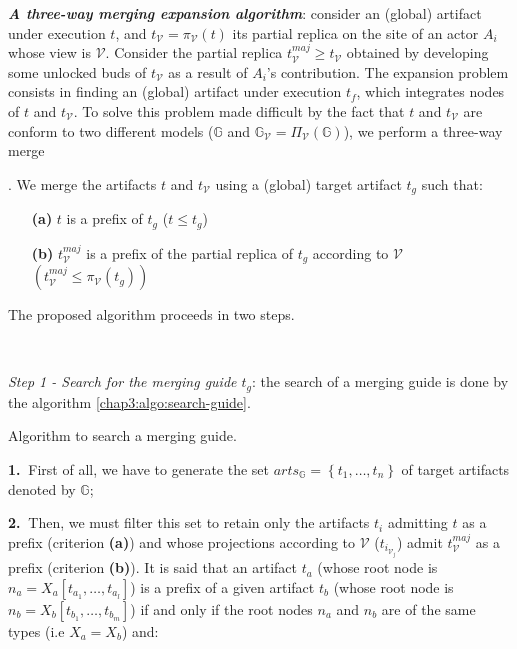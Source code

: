 \noindent\textbf{\textit{A three-way merging expansion algorithm}}\label{three-way-merge}: consider an (global) artifact under execution $t$, and $t_{\mathcal{V}}=\pi_{\mathcal{V}}\left(t\right)$ its partial replica on the site of an actor $A_i$ whose view is $\mathcal{V}$. Consider the partial replica $t_{\mathcal{V}}^{maj} \geq t_{\mathcal{V}}$ obtained by developing some unlocked buds of $t_{\mathcal{V}}$ as a result of $A_i$'s contribution. The expansion problem consists in finding an (global) artifact under execution $t_f$, which integrates nodes of $t$ and $t_{\mathcal{V}}$. To solve this problem made difficult by the fact that $t$ and $t_{\mathcal{V}}$ are conform to two different models ($\mathbb{G}$ and $\mathbb{G}_{\mathcal{V}} = \Pi_{\mathcal{V}} \left(\mathbb{G} \right)$), we perform a three-way merge {\cite{tomMens}. We merge the artifacts $t$ and $t_{\mathcal{V}}$ using a (global) target artifact $t_g$ such that: 
\begin{enumerate}
	\item[\textbf{(a)}] $t$ is a prefix of $t_g$ ($t \leq t_g$)
	\item[\textbf{(b)}] $t_{\mathcal{V}}^{maj}$ is a prefix of the partial replica of $t_g$ according to $\mathcal{V}$ $\left(t_{\mathcal{V}}^{maj} \leq \pi_{\mathcal{V}}\left(t_g \right)\right)$
\end{enumerate}	
The proposed algorithm proceeds in two steps.
	
~
	
\noindent\textit{Step 1 - Search for the merging guide $t_g$}:
the search of a merging guide is done by the algorithm \ref{chap3:algo:search-guide}.

\begin{algorithm}
\small
\caption{Algorithm to search a merging guide.}
\label{chap3:algo:search-guide}
\begin{mdframed}[style=MyFrame]
	\noindent\textbf{1.}$~$ First of all, we have to generate the set $arts_{\mathbb{G}}=\left\{t_1,\ldots,t_n\right\}$ of target artifacts denoted by $\mathbb{G}$;
	
	\noindent\textbf{2.}$~$ Then, we must filter this set to retain only the artifacts $t_i$ admitting $t$ as a prefix (criterion \textbf{(a)}) and whose projections according to $\mathcal{V}$ ($t_{i_{\mathcal{V}_j}}$) admit $t_{\mathcal{V}}^{maj}$ as a prefix (criterion \textbf{(b)}). It is said that an artifact $t_a$ (whose root node is $n_a=X_a[t_{a_1},\ldots,t_{a_l}]$) is a prefix of a given artifact $t_b$ (whose root node is $n_b=X_b[t_{b_1},\ldots,t_{b_m}]$) if and only if the root nodes $n_a$ and $n_b$ are of the same types (i.e $X_a=X_b$) and:
	

\end{mdframed}
\end{algorithm}}
